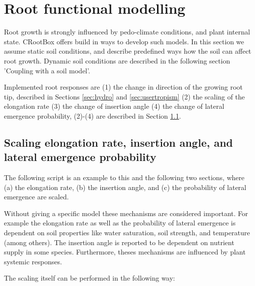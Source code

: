 \documentclass[a4paper]{article}
\begin{document}
\section{Root functional modelling}

Root growth is strongly influenced by pedo-climate conditions, and plant internal state. CRootBox offers build in ways to develop such models. 
In this section we assume static soil conditions, and describe predefined ways how the soil can affect root growth.
Dynamic soil conditions are described in the following section 'Coupling with a soil model'. 

Implemented root responses are (1) the change in direction of the growing root tip, described in Sections \ref{sec:hydro} and \ref{sec:usertropism} 
(2) the scaling of the elongation rate (3) the change of insertion angle (4) the change of lateral emergence probability, (2)-(4) are described in Section \ref{sec:elongation}.

\subsection{Scaling elongation rate, insertion angle, and lateral emergence probability} \label{sec:elongation}

The following script is an example to this and the following two sections, where (a) the elongation rate, (b) the insertion angle, and (c) the probability of lateral emergence are scaled.

Without giving a specific model these mechanisms are considered important. 
For example the elongation rate as well as the probability of lateral emergence is dependent on soil properties like water saturation, soil strength, and temperature (among others).  
The insertion angle is reported to be dependent on nutrient supply in some species. Furthermore, theses mechanisms are influenced by plant systemic responses.

The scaling itself can be performed in the following way:


\end{document}
